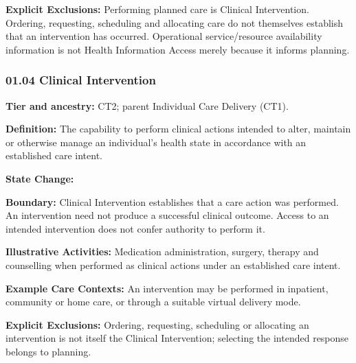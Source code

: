 \label{rad:business:230}

\textbf{Explicit Exclusions:} Performing planned care is Clinical Intervention. Ordering, requesting, scheduling and allocating care do not themselves establish that an intervention has occurred. Operational service/\allowbreak{}resource availability information is not Health Information Access merely because it informs planning.

\label{rad:business:235}



\label{rad:business:237}
\subsubsection*{01.04 Clinical Intervention}
\label{rad:business:239}

\textbf{Tier and ancestry:} CT2; parent Individual Care Delivery (CT1).

\label{rad:business:241}

\textbf{Definition:} The capability to perform clinical actions intended to alter, maintain or otherwise manage an individual's health state in accordance with an established care intent.

\label{rad:business:245}

\textbf{State Change:} \texttt{}

\label{rad:business:247}

\textbf{Boundary:} Clinical Intervention establishes that a care action was performed. An intervention need not produce a successful clinical outcome. Access to an intended intervention does not confer authority to perform it.

\label{rad:business:251}

\textbf{Illustrative Activities:} Medication administration, surgery, therapy and counselling when performed as clinical actions under an established care intent.

\label{rad:business:254}

\textbf{Example Care Contexts:} An intervention may be performed in inpatient, community or home care, or through a suitable virtual delivery mode.

\label{rad:business:257}

\textbf{Explicit Exclusions:} Ordering, requesting, scheduling or allocating an intervention is not itself the Clinical Intervention; selecting the intended response belongs to planning.

